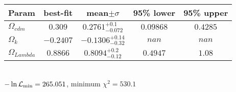 \begin{tabular}{|l|c|c|c|c|} 
 \hline 
Param & best-fit & mean$\pm\sigma$ & 95\% lower & 95\% upper \\ \hline 
$\Omega{}_{cdm }$ &$0.309$ & $0.2761_{-0.072}^{+0.1}$ & $0.09868$ & $0.4285$ \\ 
$\Omega{}_{k }$ &$-0.2407$ & $-0.1306_{-0.32}^{+0.14}$ & $nan$ & $nan$ \\ 
$\Omega{}_{Lambda }$ &$0.8866$ & $0.8094_{-0.12}^{+0.2}$ & $0.4947$ & $1.08$ \\ 
\hline 
 \end{tabular} \\ 
$-\ln{\cal L}_\mathrm{min} =265.051$, minimum $\chi^2=530.1$ \\ 
